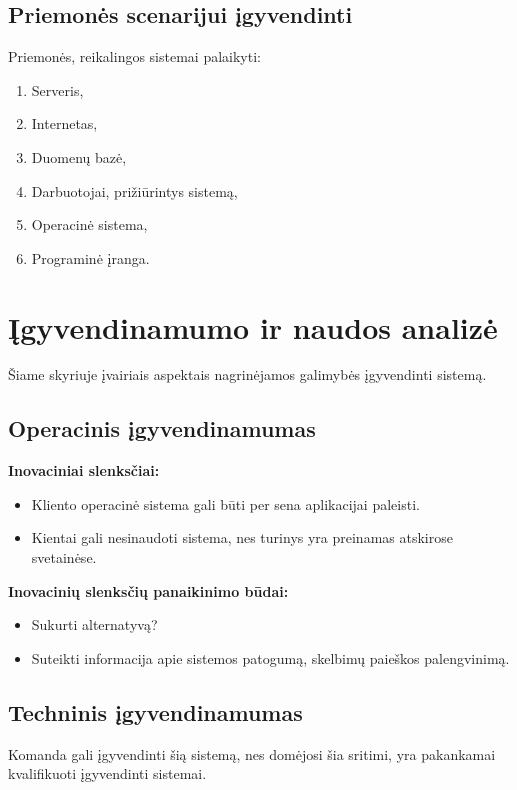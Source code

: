 \documentclass[12pt]{article}
\begin{document}
	\subsection{Priemonės scenarijui įgyvendinti}
	Priemonės, reikalingos sistemai palaikyti:
	\begin{enumerate}
		\item{Serveris,}
		\item{Internetas,}
		\item{Duomenų bazė,}
		\item{Darbuotojai, prižiūrintys sistemą,}
		\item{Operacinė sistema,}
		\item{Programinė įranga.}
	\end{enumerate}
	\pagebreak
	
	\section{Įgyvendinamumo ir naudos analizė}
	
	Šiame skyriuje įvairiais aspektais nagrinėjamos galimybės įgyvendinti sistemą.
	
	\subsection{Operacinis įgyvendinamumas}
	
	\textbf{Inovaciniai slenksčiai:}
	\begin{itemize}
		\item{Kliento operacinė sistema gali būti per sena aplikacijai paleisti.}
		\item{Kientai gali nesinaudoti sistema, nes turinys yra preinamas atskirose svetainėse.}
	\end{itemize}
	
	\textbf{Inovacinių slenksčių panaikinimo būdai:}
	\begin{itemize}
		\item{Sukurti alternatyvą?}
		\item{Suteikti informacija apie sistemos patogumą, skelbimų paieškos palengvinimą.}
	\end{itemize}
	
	
	\subsection{Techninis įgyvendinamumas}
	Komanda gali įgyvendinti šią sistemą, nes domėjosi šia sritimi, yra pakankamai kvalifikuoti įgyvendinti sistemai.
	
\end{document}

